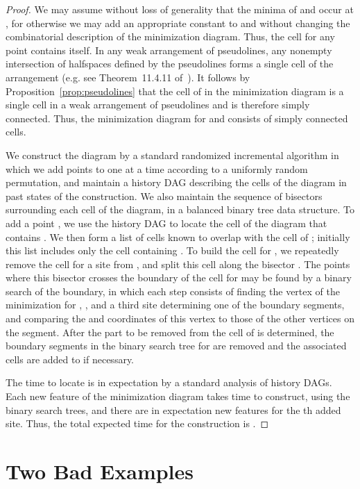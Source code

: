 \documentclass[10pt, conference, compsocconf]{IEEEtran}
\begin{document}
\begin{proof}
We may assume without loss of generality that the minima of  and  occur at , for otherwise we may add an appropriate constant to  and  without changing the combinatorial description of the minimization diagram. Thus, the cell for any point  contains  itself. In any weak arrangement of pseudolines, any nonempty intersection of halfspaces defined by the pseudolines forms a single cell of the arrangement (e.g. see Theorem~11.4.11 of~\cite{EppFalOvc-07}).
It follows by Proposition~\ref{prop:pseudolines} that the cell of  in the minimization diagram is a single cell in a weak arrangement of pseudolines and is therefore simply connected. Thus, the minimization diagram for  and  consists of  simply connected cells.

We construct the diagram by a standard randomized incremental algorithm in which we add points to  one at a time according to a uniformly random permutation, and maintain a history DAG describing the cells of the diagram in past states of the construction. We also maintain the sequence of bisectors surrounding each cell of the diagram, in a balanced binary tree data structure. To add a point , we use the history DAG to locate the cell of the diagram that contains . We then form a list  of cells known to overlap with the cell of ; initially this list includes only the cell containing . To build the cell for , we repeatedly remove the cell for a site  from , and split this cell along the bisector . The points where this bisector crosses the boundary of the cell for  may be found by a binary search of the boundary, in which each step consists of finding the vertex of the minimization for , , and a third site determining one of the boundary segments, and comparing the  and  coordinates of this vertex to those of the other vertices on the segment. After the part to be removed from the cell of  is determined, the boundary segments in the binary search tree for  are removed and the associated cells are added to  if necessary.

The time to locate  is  in expectation by a standard analysis of history DAGs.
Each new feature of the minimization diagram takes  time to construct, using the binary search trees, and there are in expectation  new features for the th added site. Thus, the total expected time for the construction is .
\end{proof}

\section{Two Bad Examples}
\label{sec:bad-examples}
\end{document}
